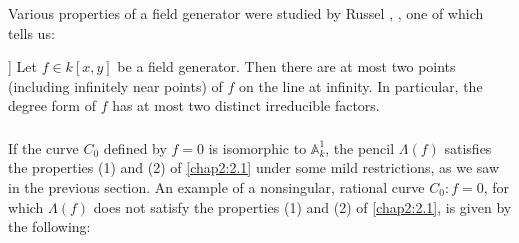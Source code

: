 \subsubsection{}\label{chap2:2.4.2}
Various properties of a field generator were studied by Russel
\cite{48}, \cite{50}, one of which tells us:

\begin{lemma*}[Russell [48; Cor. 3.7] ]
Let $f\in k[x,y]$ be a field generator. Then there are at most two
points (including infinitely near points) of $f$ on the line at
infinity. In particular, the degree form of $f$ has at most two
distinct irreducible factors.
\end{lemma*}

\subsubsection{}\label{chap2:2.4.3}
If the curve $C_{0}$ defined by $f=0$ is isomorphic to
$\mathbb{A}^{1}_{k}$, the pencil $\Lambda(f)$ satisfies the properties
(1) and (2) of \ref{chap2:2.1} under some mild restrictions, as we saw in
the previous section. An example of a nonsingular, rational curve
$C_{0}:f=0$, for which $\Lambda(f)$ does not satisfy the properties
(1) and (2) of \ref{chap2:2.1}, is given by the following:

